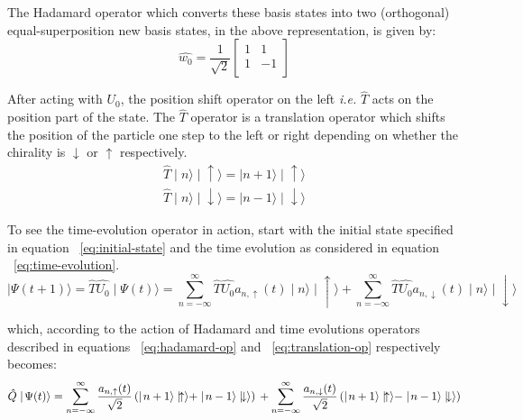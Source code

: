 \documentclass[english]{article}
\begin{document}
The Hadamard operator which converts these basis states into two (orthogonal) equal-superposition new basis states, in the above representation, is given by:
\begin{equation}
\hat{w_{0}} = \dfrac{1}{\sqrt{2}} \left[ \!\begin{array}{cc}
                       1 &  1 \\
                       1 & -1 \\
         \end{array} \!\right]
\end{equation} 

After acting with $U_{0}$, the position shift operator on the left \textit{i.e.} $\hat{T}$ acts on the position part of the state. The $\hat{T}$ operator is a translation operator which shifts the position of the particle one step to the left or right depending on whether the chirality is $\downarrow$ or $\uparrow$ respectively. 
\begin{equation}\label{eq:translation-op}
\begin{aligned}
\hat{T}\mid\! n\rangle \mid\! \uparrow\rangle = \mid\! n+1\rangle \mid\! \uparrow\rangle \\
\hat{T}\mid\! n\rangle \mid\! \downarrow\rangle = \mid\! n-1\rangle \mid\! \downarrow\rangle 
\end{aligned}
\end{equation}  

To see the time-evolution operator in action, start with the initial state specified in equation ~\eqref{eq:initial-state} and the time evolution as considered in equation ~\eqref{eq:time-evolution}.
\[ \mid\!\Psi(t+1)\rangle = \hat{T}\hat{U_{0}} \mid\! \Psi(t)\rangle =  \displaystyle \sum\limits_{n = -\infty}^{\infty} \hat{T}\hat{U_{0}} a_{n,\uparrow}(t) \mid\! n\rangle \mid\!\uparrow\rangle +  \displaystyle \sum\limits_{n = -\infty}^{\infty} \hat{T}\hat{U_{0}} a_{n,\downarrow}(t) \mid\! n\rangle \mid\!\downarrow\rangle \]

which, according to the action of Hadamard and time evolutions operators described in equations ~\eqref{eq:hadamard-op} and ~\eqref{eq:translation-op} respectively becomes:
\[ \hat{Q}\mid\! \Psi(t)\rangle =  \displaystyle \sum\limits_{n = -\infty}^{\infty}  \dfrac{a_{n,\uparrow}(t)}{\sqrt{2}} \left( \mid\! n+1\rangle \mid\!\uparrow\rangle + \mid\! n-1\rangle \mid\!\downarrow\rangle  \right) \\
   +  \displaystyle \sum\limits_{n = -\infty}^{\infty} \dfrac{a_{n,\downarrow}(t)}{\sqrt{2}} \left(  \mid\! n+1\rangle \mid\!\uparrow\rangle - \mid\! n-1\rangle \mid\!\downarrow\rangle   \right)    \]
\end{document}
